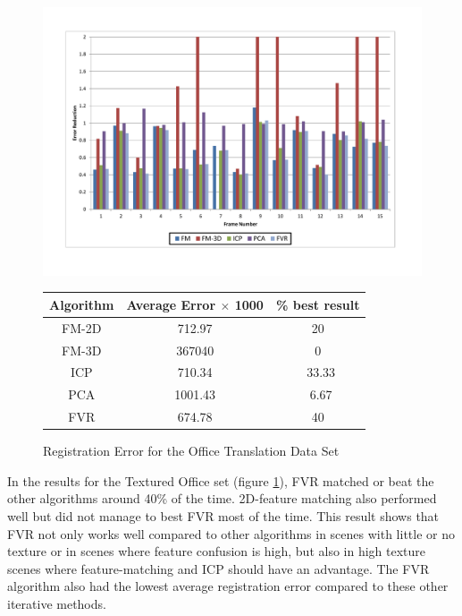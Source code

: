 \begin{figure}
\centering
\includegraphics[width=6in]{images/results/Office_TexturedItems_Translation}
\caption{Registration Error for the Office Translation Data Set}
\label{fig:PET8}

\begin{tabular}{ccc}
\hline
\textbf{Algorithm} & \textbf{Average Error $\times$ 1000} & \textbf{\% best result}\\ \hline
FM-2D	& 712.97 & 20\\
FM-3D	& 367040 & 0\\
ICP		& 710.34 & ~33.33\\
PCA		& 1001.43 & ~6.67\\
FVR		& 674.78 & 40\\
\end{tabular}
\end{figure} 


In the results for the Textured Office set (figure \ref{fig:PET8}), FVR matched or beat the other algorithms around 40\% of the time. 2D-feature matching also performed well but did not manage to best FVR most of the time. This result shows that FVR not only works well compared to other algorithms in scenes with little or no texture or in scenes where feature confusion is high, but also in high texture scenes where feature-matching and ICP should have an advantage. The FVR algorithm also had the lowest average registration error compared to these other iterative methods. \\

